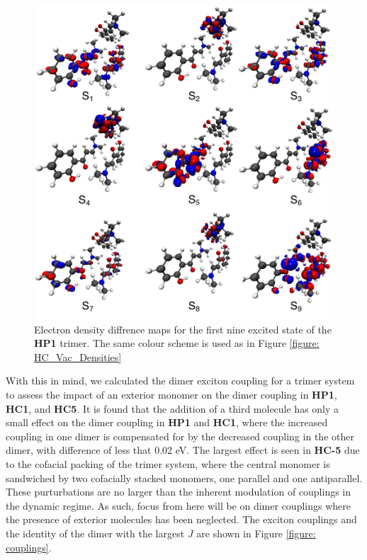 \begin{figure}[t]
\centering
  \includegraphics[width=0.8\linewidth]{5ConnectingCrystalStructure/trimer_excitations}
  \caption[Electron density diffrence maps for the first nine excited state of the \textbf{HP1} trimer.]{Electron density diffrence maps for the first nine excited state of the \textbf{HP1} trimer. The same colour scheme is used as in Figure \ref{figure: HC_Vac_Densities}}
  \label{figure: trimer_excitations}
\end{figure} 


With this in mind, we  calculated the dimer exciton coupling for a trimer system to assess the impact of an exterior monomer on the dimer coupling in \textbf{HP1}, \textbf{HC1}, and \textbf{HC5}. It is found that the addition of a third molecule has only a small effect on the dimer coupling in \textbf{HP1} and \textbf{HC1}, where the increased coupling in one dimer is compensated for by the decreased coupling in the other dimer, with difference of less that 0.02 eV. The largest effect is seen in \textbf{HC-5} due to the cofacial packing of the trimer system, where the central monomer is sandwiched by two cofacially stacked monomers, one parallel and one antiparallel.  These purturbations are no larger than the inherent modulation of couplings in the dynamic regime.\cite{Arago2015,Arago2016} As such, focus from here will be on dimer couplings where the presence of exterior molecules has been neglected. The exciton couplings and the identity of the dimer with the largest $J$ are shown in Figure \ref{figure: couplings}.

